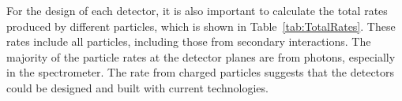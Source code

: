 \documentclass[../../main.tex]{subfiles}
\begin{document}
    For the design of each detector, it is also important to calculate the total rates produced by different particles, which is shown in Table~\ref{tab:TotalRates}. These rates include all particles, including those from secondary interactions. The majority of the particle rates at the detector planes are from photons, especially in the spectrometer. The rate from charged particles suggests that the detectors could be designed and built with current technologies.
    \begin{table}[htbp]
        \centering
\end{table}
\end{document}
